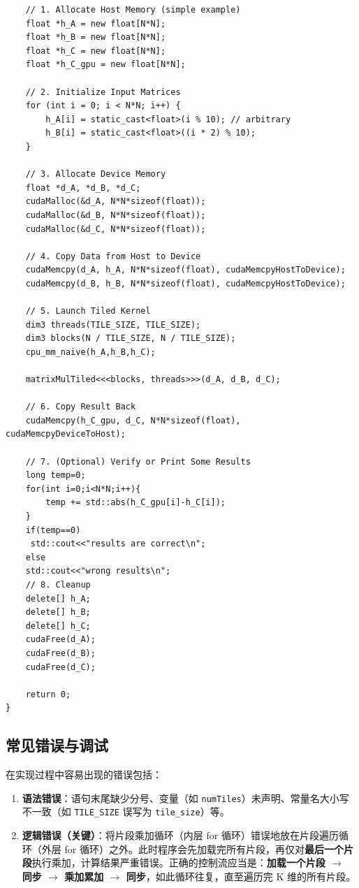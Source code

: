 \begin{lstlisting}
    // 1. Allocate Host Memory (simple example)
    float *h_A = new float[N*N];
    float *h_B = new float[N*N];
    float *h_C = new float[N*N];
    float *h_C_gpu = new float[N*N];

    // 2. Initialize Input Matrices
    for (int i = 0; i < N*N; i++) {
        h_A[i] = static_cast<float>(i % 10); // arbitrary
        h_B[i] = static_cast<float>((i * 2) % 10);
    }

    // 3. Allocate Device Memory
    float *d_A, *d_B, *d_C;
    cudaMalloc(&d_A, N*N*sizeof(float));
    cudaMalloc(&d_B, N*N*sizeof(float));
    cudaMalloc(&d_C, N*N*sizeof(float));

    // 4. Copy Data from Host to Device
    cudaMemcpy(d_A, h_A, N*N*sizeof(float), cudaMemcpyHostToDevice);
    cudaMemcpy(d_B, h_B, N*N*sizeof(float), cudaMemcpyHostToDevice);

    // 5. Launch Tiled Kernel
    dim3 threads(TILE_SIZE, TILE_SIZE);
    dim3 blocks(N / TILE_SIZE, N / TILE_SIZE);
    cpu_mm_naive(h_A,h_B,h_C);

    matrixMulTiled<<<blocks, threads>>>(d_A, d_B, d_C);

    // 6. Copy Result Back
    cudaMemcpy(h_C_gpu, d_C, N*N*sizeof(float), cudaMemcpyDeviceToHost);

    // 7. (Optional) Verify or Print Some Results
    long temp=0;
    for(int i=0;i<N*N;i++){
        temp += std::abs(h_C_gpu[i]-h_C[i]);
    }
    if(temp==0) 
     std::cout<<"results are correct\n";
    else
    std::cout<<"wrong results\n";
    // 8. Cleanup
    delete[] h_A;
    delete[] h_B;
    delete[] h_C;
    cudaFree(d_A);
    cudaFree(d_B);
    cudaFree(d_C);

    return 0;
}

\end{lstlisting}

\subsection{常见错误与调试}

在实现过程中容易出现的错误包括：

\begin{enumerate}
    \item \textbf{语法错误}：语句末尾缺少分号、变量（如 \texttt{numTiles}）未声明、常量名大小写不一致（如 \texttt{TILE\_SIZE} 误写为 \texttt{tile\_size}）等。
    \item \textbf{逻辑错误（关键）}：将片段乘加循环（内层 for 循环）错误地放在片段遍历循环（外层 for 循环）之外。此时程序会先加载完所有片段，再仅对\textbf{最后一个片段}执行乘加，计算结果严重错误。正确的控制流应当是：\textbf{加载一个片段 $\to$ 同步 $\to$ 乘加累加 $\to$ 同步}，如此循环往复，直至遍历完 K 维的所有片段。
\end{enumerate}


